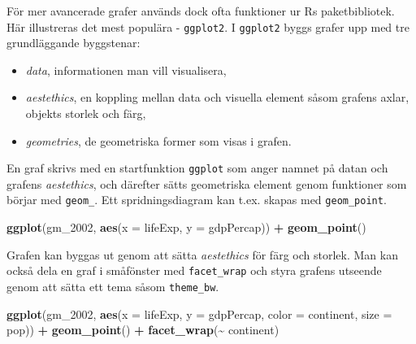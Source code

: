 \documentclass[
]{book}
\newenvironment{Shaded}{\begin{snugshade}}{\end{snugshade}}
\newcommand{\AttributeTok}[1]{\textcolor[rgb]{0.13,0.29,0.53}{#1}}
\newcommand{\FunctionTok}[1]{\textcolor[rgb]{0.13,0.29,0.53}{\textbf{#1}}}
\newcommand{\NormalTok}[1]{#1}
\newcommand{\SpecialCharTok}[1]{\textcolor[rgb]{0.81,0.36,0.00}{\textbf{#1}}}
\providecommand{\tightlist}{%
  \setlength{\itemsep}{0pt}\setlength{\parskip}{0pt}}
\theoremstyle{definition}
\theoremstyle{definition}
\theoremstyle{definition}
\theoremstyle{definition}
\theoremstyle{remark}
\begin{document}
För mer avancerade grafer används dock ofta funktioner ur Rs paketbibliotek. Här illustreras det mest populära - \texttt{ggplot2}. I \texttt{ggplot2} byggs grafer upp med tre grundläggande byggstenar:

\begin{itemize}
\tightlist
\item
  \emph{data}, informationen man vill visualisera,
\item
  \emph{aestethics}, en koppling mellan data och visuella element såsom grafens axlar, objekts storlek och färg,
\item
  \emph{geometries}, de geometriska former som visas i grafen.
\end{itemize}

En graf skrivs med en startfunktion \texttt{ggplot} som anger namnet på datan och grafens \emph{aestethics}, och därefter sätts geometriska element genom funktioner som börjar med \texttt{geom\_}. Ett spridningsdiagram kan t.ex. skapas med \texttt{geom\_point}.

\begin{Shaded}
\begin{Highlighting}[]
\FunctionTok{ggplot}\NormalTok{(gm\_2002, }\FunctionTok{aes}\NormalTok{(}\AttributeTok{x =}\NormalTok{ lifeExp, }\AttributeTok{y =}\NormalTok{ gdpPercap)) }\SpecialCharTok{+} 
  \FunctionTok{geom\_point}\NormalTok{()}
\end{Highlighting}
\end{Shaded}

Grafen kan byggas ut genom att sätta \emph{aestethics} för färg och storlek. Man kan också dela en graf i småfönster med \texttt{facet\_wrap} och styra grafens utseende genom att sätta ett tema såsom \texttt{theme\_bw}.

\begin{Shaded}
\begin{Highlighting}[]
\FunctionTok{ggplot}\NormalTok{(gm\_2002, }\FunctionTok{aes}\NormalTok{(}\AttributeTok{x =}\NormalTok{ lifeExp, }\AttributeTok{y =}\NormalTok{ gdpPercap, }
                    \AttributeTok{color =}\NormalTok{ continent, }\AttributeTok{size =}\NormalTok{ pop)) }\SpecialCharTok{+}
  \FunctionTok{geom\_point}\NormalTok{() }\SpecialCharTok{+}
  \FunctionTok{facet\_wrap}\NormalTok{(}\SpecialCharTok{\textasciitilde{}}\NormalTok{ continent)}
\end{Highlighting}
\end{Shaded}
\end{document}
